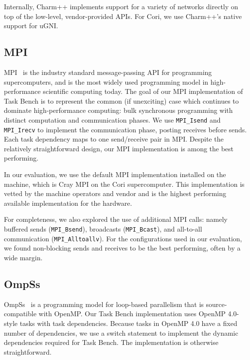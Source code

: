 Internally, Charm++ implements support for a variety of networks
directly on top of the low-level, vendor-provided APIs. For Cori, we
use Charm++'s native support for uGNI.

\subsection{MPI}

MPI~\cite{MPI} is the industry standard message-passing API for
programming supercomputers, and is the most widely used programming
model in high-performance scientific computing today. The goal of our
MPI implementation of Task Bench is to represent the common (if
unexciting) case which continues to dominate high-performance
computing: bulk synchronous programming with distinct computation and
communication phases. We use \lstinline[language=C++]{MPI_Isend} and
\lstinline[language=C++]{MPI_Irecv} to implement the communication
phase, posting receives before sends. Each task dependency maps to one
send/receive pair in MPI. Despite the relatively straightforward
design, our MPI implementation is among the best performing.

In our evaluation, we use the default MPI implementation installed on
the machine, which is Cray MPI on the Cori supercomputer. This
implementation is vetted by the machine operators and vendor and is
the highest performing available implementation for the hardware.

For completeness, we also explored the use of additional MPI calls:
namely buffered sends (\lstinline[language=C++]{MPI_Bsend}),
broadcasts (\lstinline[language=C++]{MPI_Bcast}), and all-to-all
communication (\lstinline[language=C++]{MPI_Alltoallv}). For the
configurations used in our evaluation, we found non-blocking sends and
receives to be the best performing, often by a wide margin.

\subsection{OmpSs}

OmpSs~\cite{OmpSs11} is a programming model for loop-based parallelism
that is source-compatible with OpenMP. Our Task Bench implementation
uses OpenMP 4.0-style tasks with task dependencies. Because tasks in
OpenMP 4.0 have a fixed number of dependencies, we use a switch
statement to implement the dynamic dependencies required for Task
Bench. The implementation is otherwise straightforward.


